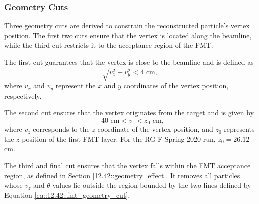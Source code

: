 \subsubsection{Geometry Cuts}
\label{13.22::geometry_cuts}
    Three geometry cuts are derived to constrain the reconstructed particle's vertex position.
    The first two cuts ensure that the vertex is located along the beamline, while the third cut restricts it to the acceptance region of the FMT.

    The first cut guarantees that the vertex is close to the beamline and is defined as
    \begin{equation*}
        \sqrt{v_x^2 + v_y^2} < 4 \text{ cm},
    \end{equation*}
    where $v_x$ and $v_y$ represent the $x$ and $y$ coordinates of the vertex position, respectively.

    The second cut ensures that the vertex originates from the target and is given by
    \begin{equation*}
        -40 \text{ cm} < v_z < z_0 \text{ cm},
    \end{equation*}
    where $v_z$ corresponds to the $z$ coordinate of the vertex position, and $z_0$ represents the $z$ position of the first FMT layer.
    For the RG-F Spring 2020 run, $z_0 = 26.12$ cm.

    The third and final cut ensures that the vertex falls within the FMT acceptance region, as defined in Section \ref{12.42::geometry_effect}.
    It removes all particles whose $v_z$ and $\theta$ values lie outside the region bounded by the two lines defined by Equation \eqref{eq::12.42::fmt_geometry_cut}.
